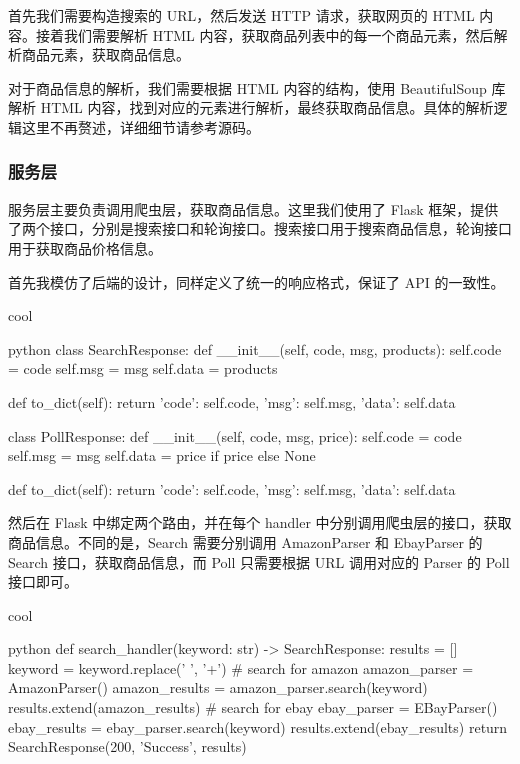 首先我们需要构造搜索的 URL，然后发送 HTTP 请求，获取网页的 HTML 内容。接着我们需要解析 HTML 内容，获取商品列表中的每一个商品元素，然后解析商品元素，获取商品信息。

对于商品信息的解析，我们需要根据 HTML 内容的结构，使用 BeautifulSoup 库解析 HTML 内容，找到对应的元素进行解析，最终获取商品信息。具体的解析逻辑这里不再赘述，详细细节请参考源码。

\subsubsection{服务层}

服务层主要负责调用爬虫层，获取商品信息。这里我们使用了 Flask 框架，提供了两个接口，分别是搜索接口和轮询接口。搜索接口用于搜索商品信息，轮询接口用于获取商品价格信息。

首先我模仿了后端的设计，同样定义了统一的响应格式，保证了 API 的一致性。

\begin{codebox}{}{cool}
\begin{amzcode}{python}
class SearchResponse:
    def __init__(self, code, msg, products):
        self.code = code
        self.msg = msg
        self.data = products

    def to_dict(self):
        return {
            'code': self.code,
            'msg': self.msg,
            'data': self.data
        }

class PollResponse:
    def __init__(self, code, msg, price):
        self.code = code
        self.msg = msg
        self.data = price if price else None
        
    def to_dict(self):
        return {
            'code': self.code,
            'msg': self.msg,
            'data': self.data
        }
\end{amzcode}
\end{codebox}

然后在 Flask 中绑定两个路由，并在每个 handler 中分别调用爬虫层的接口，获取商品信息。不同的是，Search 需要分别调用 AmazonParser 和 EbayParser 的 Search 接口，获取商品信息，而 Poll 只需要根据 URL 调用对应的 Parser 的 Poll 接口即可。

\begin{codebox}{}{cool}
\begin{amzcode}{python}
def search_handler(keyword: str) -> SearchResponse:
    results = []
    keyword = keyword.replace(' ', '+')
    # search for amazon
    amazon_parser = AmazonParser()
    amazon_results = amazon_parser.search(keyword)
    results.extend(amazon_results)
    # search for ebay
    ebay_parser = EBayParser()
    ebay_results = ebay_parser.search(keyword)
    results.extend(ebay_results)
    return SearchResponse(200, 'Success', results)
\end{amzcode}
\end{codebox}


